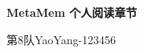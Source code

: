 \documentclass{jos}
\begin{document}
\raggedbottom
\begin{center}
{\Large\bfseries MetaMem 个人阅读章节}\par
第8队\quad YaoYang-123456
\end{center}



\end{document}
